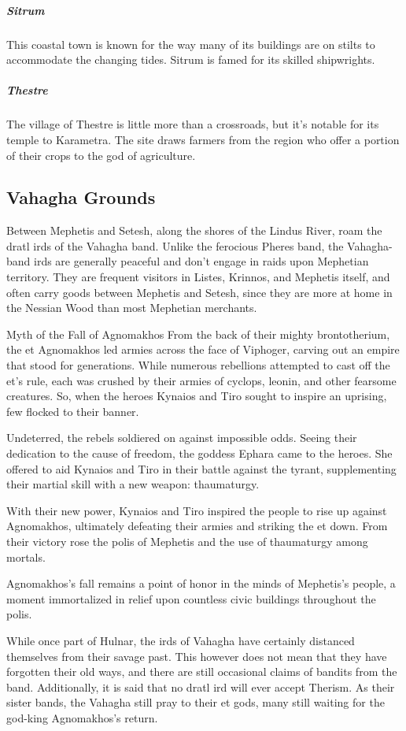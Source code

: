         \subparagraph{Sitrum} This coastal town is known for the way many of its buildings are on stilts to accommodate the changing tides.
        Sitrum is famed for its skilled shipwrights.

        \subparagraph{Thestre} The village of Thestre is little more than a crossroads, but it's notable for its temple to Karametra.
        The site draws farmers from the region who offer a portion of their crops to the god of agriculture.

\subsection*{Vahagha Grounds}
    Between Mephetis and Setesh, along the shores of the Lindus River, roam the dratl irds of the Vahagha band.
    Unlike the ferocious Pheres band, the Vahagha-band irds are generally peaceful and don't engage in raids upon Mephetian territory.
    They are frequent visitors in Listes, Krinnos, and Mephetis itself, and often carry goods between Mephetis and Setesh, since they are more at home in the Nessian Wood than most Mephetian merchants.

    \begin{DndComment}[float=t]{Myth of the Fall of Agnomakhos}
        From the back of their mighty brontotherium, the et Agnomakhos led armies across the face of Viphoger, carving out an empire that stood for generations.
        While numerous rebellions attempted to cast off the et's rule, each was crushed by their armies of cyclops, leonin, and other fearsome creatures.
        So, when the heroes Kynaios and Tiro sought to inspire an uprising, few flocked to their banner.

        Undeterred, the rebels soldiered on against impossible odds.
        Seeing their dedication to the cause of freedom, the goddess Ephara came to the heroes.
        She offered to aid Kynaios and Tiro in their battle against the tyrant, supplementing their martial skill with a new weapon: thaumaturgy.

        With their new power, Kynaios and Tiro inspired the people to rise up against Agnomakhos, ultimately defeating their armies and striking the et down.
        From their victory rose the polis of Mephetis and the use of thaumaturgy among mortals.

        Agnomakhos's fall remains a point of honor in the minds of Mephetis's people, a moment immortalized in relief upon countless civic buildings throughout the polis.
    \end{DndComment}

    While once part of Hulnar, the irds of Vahagha have certainly distanced themselves from their savage past.
    This however does not mean that they have forgotten their old ways, and there are still occasional claims of bandits from the band.
    Additionally, it is said that no dratl ird will ever accept Therism.
    As their sister bands, the Vahagha still pray to their et gods, many still waiting for the god-king Agnomakhos's return.

\newpage~\newpage
